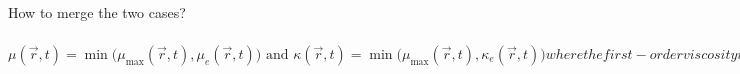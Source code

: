 \documentclass[xcolor=dvipsnames,10pt]{beamer}
\renewcommand{\Re}{\textrm{Re}}
\newcommand{\resi}{R}
\newcommand{\resinew}{\widetilde{\resi}}
\newcommand{\grad}{\vec{\nabla}}
\newcommand{\mbold}[1]{\boldsymbol#1}
\newcommand{\norm}{\textrm{norm}}
\newcommand{\tcr}[1]{\textcolor{red}{#1}}
\begin{document}
\begin{frame}{How to merge the two cases?}
\begin{subequations}
%
\begin{equation}
\mu(\vec{r},t)    = \min \Big (\mu_{\max}(\vec{r},t), \mu_e (\vec{r},t)    \Big) \text{  and  }
\kappa(\vec{r},t) = \min \Big (\mu_{\max}(\vec{r},t), \kappa_e (\vec{r},t) \Big ) \nonumber
\end{equation}
%
where the first-order viscosity is given by
\begin{equation}
  \kappa_{\max}(\vec{r},t)  = \mu_{\max} (\vec{r},t) = \frac{h}{2} \Big ( ||\mbold u|| + c \Big ) \nonumber
\end{equation}
%
and the entropy viscosity coefficients by 
%
\begin{equation}
\kappa_{e}(\vec{r},t) = \frac{h^2 \max(\resinew, J)}{ \rho c^2 }  \text{  and  }
\mu_{e}(\vec{r},t)    = \frac{h^2 \max(\resinew, J)}{ \norm_P^\mu} \nonumber
\end{equation}
%
where %
%
\begin{equation}
\norm_P^\mu = \Re_\infty \rho_\infty c_\infty^2 =  \left\{
\begin{array}{ll}
 \rho ||\mbold u ||^2       & \text{ if } \left| \resinew^* \right| \geq M \text{ (i.e., non-isentropic flow)} \\
 \rho c^2 = \norm_P^\kappa & \text{ otherwise} 
\end{array}
\right. \nonumber
\end{equation}
% 
with the jumps given by
%
\begin{equation}
J = || \vec{u} || \max \Big ( [[ \grad P \cdot \vec{n} ]], c^2 [[\grad \rho \cdot \vec{n}]] \Big) \nonumber
\end{equation}
\end{subequations}
\end{frame}
\end{document}

